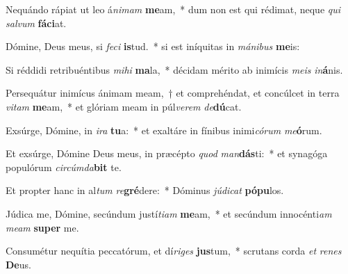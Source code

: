 \item Nequándo rápiat ut leo á\textit{ni}\textit{mam} \textbf{me}am,~* dum non est qui rédimat, neque \textit{qui} \textit{sal}\textit{vum} \textbf{fá}\textbf{ci}at.
\item Dómine, Deus meus, si \textit{fe}\textit{ci} \textbf{is}tud.~* si est iníquitas in \textit{má}\textit{ni}\textit{bus} \textbf{me}is:
\item Si réddidi retribuéntibus \textit{mi}\textit{hi} \textbf{ma}la,~* décidam mérito ab inimícis \textit{me}\textit{is} \textit{in}\textbf{á}nis.
\item Persequátur inimícus ánimam meam,~† et comprehéndat, et concúlcet in terra \textit{vi}\textit{tam} \textbf{me}am,~* et glóriam meam in púl\textit{ve}\textit{rem} \textit{de}\textbf{dú}cat.
\item Exsúrge, Dómine, in \textit{i}\textit{ra} \textbf{tu}a:~* et exaltáre in fínibus inimi\textit{có}\textit{rum} \textit{me}\textbf{ó}rum.
\item Et exsúrge, Dómine Deus meus, in præcépto \textit{quod} \textit{man}\textbf{dás}ti:~* et synagóga populórum \textit{cir}\textit{cúm}\textit{da}\textbf{bit} te.
\item Et propter hanc in al\textit{tum} \textit{re}\textbf{gré}dere:~* Dóminus \textit{jú}\textit{di}\textit{cat} \textbf{pó}\textbf{pu}los.
\item Júdica me, Dómine, secúndum justí\textit{ti}\textit{am} \textbf{me}am,~* et secúndum innocénti\textit{am} \textit{me}\textit{am} \textbf{su}\textbf{per} me.
\item Consumétur nequítia peccatórum, et dí\textit{ri}\textit{ges} \textbf{jus}tum,~* scrutans corda \textit{et} \textit{re}\textit{nes} \textbf{De}us.
